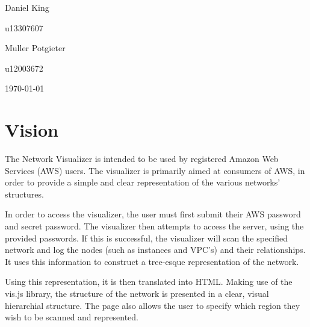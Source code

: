 \documentclass[hidelinks,a4paper,12pt]{article}
\begin{document}
\begin{titlepage}
\begin{center}
\begin{minipage}{0.4\textwidth}
\begin{flushleft} \large
Daniel {King}
\end{flushleft}
\end{minipage}
\begin{minipage}{0.4\textwidth}
\begin{flushright} \large
\emph{}
u13307607
\end{flushright}
\end{minipage}

\begin{minipage}{0.4\textwidth}
\begin{flushleft} \large
Muller {Potgieter}
\end{flushleft}
\end{minipage}
\begin{minipage}{0.4\textwidth}
\begin{flushright} \large
\emph{}
u12003672
\end{flushright}
\end{minipage}

\vfill
{\large \today}
\end{center}
\end{titlepage}
\footnotesize
%
\normalsize


\tableofcontents
\newpage
{}

\newpage
\section{Vision} 
The Network Visualizer is intended to be used by registered Amazon Web Services (AWS) users. The visualizer is primarily aimed at consumers of AWS, in order to provide a simple and clear representation of the various networks' structures.

In order to access the visualizer, the user must first submit their AWS password and secret password. The visualizer then attempts to access the server, using the provided passwords. If this is successful, the visualizer will scan the specified network and log the nodes (such as instances and VPC's) and their relationships. It uses this information to construct a tree-esque representation of the network.

Using this representation, it is then translated into HTML. Making use of the vis.js library, the structure of the network is presented in a clear, visual hierarchial structure. The page also allows the user to specify which region they wish to be scanned and represented.
\end{document}
